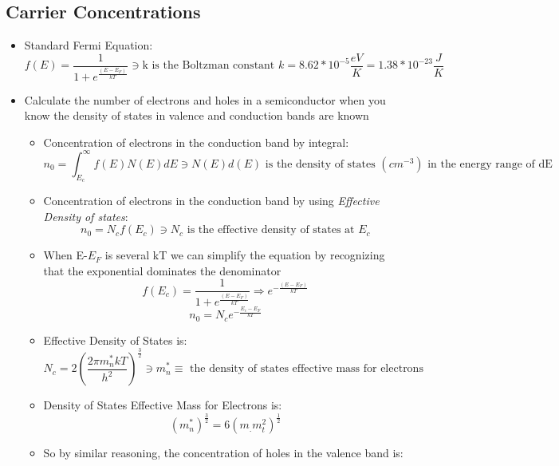 \documentclass{article}
\begin{document}
\subsection{Carrier Concentrations}
\begin{itemize}
\item Standard Fermi Equation:
  \begin{equation}f(E)=\frac{1}{1+e^{\frac{(E-E_F)}{kT}}}\ni\text{k~is~the~Boltzman~constant~} k=8.62*10^{-5}\frac{eV}{K}=1.38*10^{-23}\frac{J}{K}\end{equation}
\item Calculate the number of electrons and holes in a semiconductor when you know the density of states in valence and conduction bands are known
  \begin{itemize}
  \item Concentration of electrons in the conduction band by integral:
    \begin{equation}n_0=\int_{E_c}^{\infty}f(E)N(E)dE\ni N(E)d(E)\text{~is~the~density~of~states~}(cm^{-3})\text{~in~the~energy~range~of~dE}\end{equation}
  \item Concentration of electrons in the conduction band by using \textit{Effective Density of states}:
    \begin{equation} n_0 = N_c f (E_c) \ni N_c \text{~is~the~effective~density~of~states~at~} E_c \end{equation}
  \item When E-$E_F$ is several kT we can simplify the equation by recognizing that the exponential dominates the denominator
    \begin{equation}f(E_c)=\frac{1}{1+e^{\frac{(E-E_F)}{kT}}}\Rightarrow e^{-\frac{(E-E_F)}{kT}}\end{equation}
    \begin{equation}n_0=N_ce^{-\frac{E_c-E_F}{kT}}\end{equation}
  \item Effective Density of States is:
    \begin{equation}N_c=2(\frac{2\pi m_n^*kT}{h^2})^{\frac{3}{2}}\ni m_n^*\equiv \text{~the~density~of~states~effective~mass~for~electrons}\end{equation}
  \item Density of States Effective Mass for Electrons is:
    \begin{equation}(m_n^*)^{\frac{3}{2}}=6(m_.m_t^2)^{\frac{1}{2}}\end{equation}
  \item So by similar reasoning, the concentration of holes in the valence band is$:$

\end{itemize}
\end{itemize}
\end{document}
